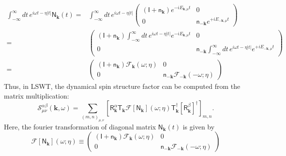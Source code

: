 \documentclass[aps, prx, nofootinbib, superscriptaddress]{revtex4-2}
\newcommand{\kvec}{\mathbf{k}}
\begin{document}
\begin{equation}
    \begin{split}
        \int_{-\infty}^{\infty} dt \, e^{i \omega t - \eta |t|} \mathsf{N}_{\kvec} (t) 
        = &
        \int_{-\infty}^{\infty} dt \, e^{i \omega t  - \eta |t|}
        \begin{pmatrix}
            ( \mathsf{I} + \mathsf{n}_{\kvec} ) e^{-{ i E}_{\kvec,\mu}t}  & 0 \\
            0                         & \mathsf{n}_{-\kvec}  e^{+{  i  E}_{-\kvec,\mu}t}
        \end{pmatrix} \\
        = &
        \begin{pmatrix}
            ( \mathsf{I} + \mathsf{n}_{\kvec} ) 
            \int_{-\infty}^{\infty} dt \, e^{i \omega t  - \eta |t|} 
            e^{-{ i E}_{\kvec,\mu}t}  & 0 \\
            0                         & \mathsf{n}_{-\kvec}  
            \int_{-\infty}^{\infty} dt \, e^{i \omega t  - \eta |t|}  e^{+{  i  E}_{-\kvec,\mu}t}
        \end{pmatrix} \\
        = & 
        \begin{pmatrix}
            ( \mathsf{I} + \mathsf{n}_{\kvec} ) \mathcal{F}_{\kvec} (\omega; \eta)  & 0 \\
            0   &   \mathsf{n}_{-\kvec} \mathcal{F}_{- \kvec} (-\omega; \eta)
        \end{pmatrix} 
    \end{split}
\end{equation}
Thus, in LSWT, the dynamical spin structure factor can be computed from the matrix multiplication:
\begin{equation}
    \mathcal{S}^{\alpha\beta}_{\mu\nu} (\kvec, \omega)
    =
    \sum_{(m,n)_{\mu,\nu}} 
    \left[  \mathsf{R}^{\alpha}_{\kvec} \mathsf{T}_{\kvec}
    \mathcal{F} [\mathsf{N}_{\kvec}](\omega; \eta)
    \mathsf{T}_{\kvec}^{\dagger} [\mathsf{R}^{\beta}_{\kvec}]^{\dagger} \right]_{m,n}.
\end{equation}
Here, the fourier transformation of diagonal matrix $\mathsf{N}_{\kvec} (t)$ is given by
\begin{equation}
    \mathcal{F} [\mathsf{N}_{\kvec}](\omega; \eta)
    \equiv 
    \begin{pmatrix}
        ( \mathsf{I} + \mathsf{n}_{\kvec} )    \mathcal{F}_{ \kvec} (  \omega; \eta  )  & 0 \\
        0   &   \mathsf{n}_{-\kvec} \mathcal{F}_{-\kvec} ( -\omega; \eta  )
    \end{pmatrix} 
\end{equation}
\end{document}
